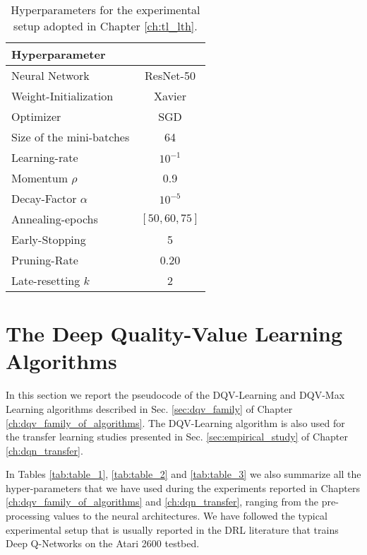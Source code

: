 \begin{table}[H]
\centering
\begin{tabular}{l | c |  }
Hyperparameter \\
\hline \hline
Neural Network & ResNet-50 \\ 
Weight-Initialization & Xavier \\
Optimizer & SGD \\
Size of the mini-batches & 64 \\ 
Learning-rate & $10^{-1}$ \\
Momentum $\rho$ & 0.9 \\
Decay-Factor $\alpha$ & $10^{-5}$ \\
Annealing-epochs & $[50,60,75]$\\
Early-Stopping & 5 \\ 
Pruning-Rate & 0.20 \\
Late-resetting $k$ & 2 \\ 
\end{tabular}
\caption{Hyperparameters for the experimental setup adopted in Chapter \ref{ch:tl_lth}.}
\label{tab:hyperparameters}
\end{table}



\section{The Deep Quality-Value Learning Algorithms}

In this section we report the pseudocode of the DQV-Learning and DQV-Max Learning algorithms described in Sec. \ref{sec:dqv_family} of Chapter \ref{ch:dqv_family_of_algorithms}. The DQV-Learning algorithm is also used for the transfer learning studies presented in Sec. \ref{sec:empirical_study} of Chapter \ref{ch:dqn_transfer}. 

In Tables \ref{tab:table_1}, \ref{tab:table_2} and \ref{tab:table_3} we also summarize all the hyper-parameters that we have used during the experiments reported in Chapters \ref{ch:dqv_family_of_algorithms} and \ref{ch:dqn_transfer}, ranging from the pre-processing values to the neural architectures. We have followed the typical experimental setup that is usually reported in the DRL literature \cite{mnih2015human, van2015deep, wang2016dueling, castro2018dopamine, sabatelli2020deep} that trains Deep Q-Networks on the Atari 2600 testbed.

